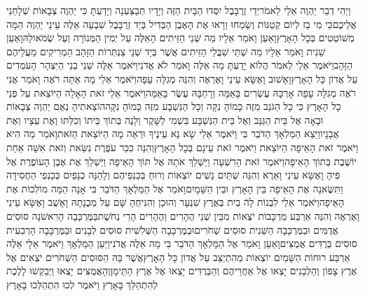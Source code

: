\documentclass[../main/main.tex]{subfiles}
\begin{document}
\begin{multicols*}{\ncols}
וַיְהִי דְבַר יַהְוֶה אֵלַי לֵאמֹר\PreVerseSpace{}יְדֵי זְרֻבָּבֶל יִסְּדוּ הַבַּיִת הַזֶּה וְיָדָיו תְּבַצַּעְנָה וְיָדַעְתָּ כִּי יַהְוֶה צְבָאוֹת שְׁלָחַנִי אֲלֵיכֶם\PreVerseSpace{}כִּי מִי בַז לְיוֹם קְטַנּוֹת וְשָׂמְחוּ וְרָאוּ אֶת הָאֶבֶן הַבְּדִיל בְּיַד זְרֻבָּבֶל שִׁבְעָה אֵלֶּה עֵינֵי יַהְוֶה הֵמָּה מְשׁוֹטְטִים בְּכָל הָאָרֶץ\PreVerseSpace{}וָאַעַן וָאֹמַר אֵלָיו מַה שְּׁנֵי הַזֵּיתִים הָאֵלֶּה עַל יְמִין הַמְּנוֹרָה וְעַל שְׂמֹאולָהּ\PreVerseSpace{}וָאַעַן שֵׁנִית וָאֹמַר אֵלָיו מַה שְׁתֵּי שִׁבֲּלֵי הַזֵּיתִים אֲשֶׁר בְּיַד שְׁנֵי צַנְתְּרוֹת הַזָּהָב הַמְרִיקִים מֵעֲלֵיהֶם הַזָּהָב\PreVerseSpace{}וַיֹּאמֶר אֵלַי לֵאמֹר הֲלוֹא יָדַעְתָּ מָה אֵלֶּה וָאֹמַר לֹא אֲדֹנִי\PreVerseSpace{}וַיֹּאמֶר אֵלֶּה שְׁנֵי בְנֵי הַיִּצְהָר הָעֹמְדִים עַל אֲדוֹן כָּל הָאָרֶץ\PreChapterSpace{}וָאָשׁוּב וָאֶשָּׂא עֵינַי וָאֶרְאֶה וְהִנֵּה מְגִלָּה עָפָה\PreVerseSpace{}וַיֹּאמֶר אֵלַי מָה אַתָּה רֹאֶה וָאֹמַר אֲנִי רֹאֶה מְגִלָּה עָפָה אָרְכָּהּ עֶשְׂרִים בָּאַמָּה וְרָחְבָּהּ עֶשֶׂר בָּאַמָּה\PreVerseSpace{}וַיֹּאמֶר אֵלַי זֹאת הָאָלָה הַיּוֹצֵאת עַל פְּנֵי כָל הָאָרֶץ כִּי כָל הַגֹּנֵב מִזֶּה כָּמוֹהָ נִקָּה וְכָל הַנִּשְׁבָּע מִזֶּה כָּמוֹהָ נִקָּה\PreVerseSpace{}הוֹצֵאתִיהָ נְאֻם יַהְוֶה צְבָאוֹת וּבָאָה אֶל בֵּית הַגַּנָּב וְאֶל בֵּית הַנִּשְׁבָּע בִּשְׁמִי לַשָּׁקֶר וְלָנֶה בְּתוֹךְ בֵּיתוֹ וְכִלַּתּוּ וְאֶת עֵצָיו וְאֶת אֲבָנָיו\PreVerseSpace{}וַיֵּצֵא הַמַּלְאָךְ הַדֹּבֵר בִּי וַיֹּאמֶר אֵלַי שָׂא נָא עֵינֶיךָ וּרְאֵה מָה הַיּוֹצֵאת הַזֹּאת\PreVerseSpace{}וָאֹמַר מַה הִיא וַיֹּאמֶר זֹאת הָאֵיפָה הַיּוֹצֵאת וַיֹּאמֶר זֹאת עֵינָם בְּכָל הָאָרֶץ\PreVerseSpace{}וְהִנֵּה כִּכַּר עֹפֶרֶת נִשֵּׂאת וְזֹאת אִשָּׁה אַחַת יוֹשֶׁבֶת בְּתוֹךְ הָאֵיפָה\PreVerseSpace{}וַיֹּאמֶר זֹאת הָרִשְׁעָה וַיַּשְׁלֵךְ אֹתָהּ אֶל תּוֹךְ הָאֵיפָה וַיַּשְׁלֵךְ אֶת אֶבֶן הָעוֹפֶרֶת אֶל פִּיהָ \ClosedSection{}וָאֶשָּׂא עֵינַי וָאֵרֶא וְהִנֵּה שְׁתַּיִם נָשִׁים יוֹצְאוֹת וְרוּחַ בְּכַנְפֵיהֶם וְלָהֵנָּה כְנָפַיִם כְּכַנְפֵי הַחֲסִידָה וַתִּשֶּׂאנָה אֶת הָאֵיפָה בֵּין הָאָרֶץ וּבֵין הַשָּׁמָיִם\PreVerseSpace{}וָאֹמַר אֶל הַמַּלְאָךְ הַדֹּבֵר בִּי אָנָה הֵמָּה מוֹלִכוֹת אֶת הָאֵיפָה\PreVerseSpace{}וַיֹּאמֶר אֵלַי לִבְנוֹת לָהֿ בַיִת בְּאֶרֶץ שִׁנְעָר וְהוּכַן וְהִנִּיחֻהָ שָּׁם עַל מְכֻנָתָהּ \ClosedSection{}וָאָשֻׁב וָאֶשָּׂא עֵינַי וָאֶרְאֶה וְהִנֵּה אַרְבַּע מַרְכָּבוֹת יֹצְאוֹת מִבֵּין שְׁנֵי הֶהָרִים וְהֶהָרִים הָרֵי נְחֹשֶׁת\PreVerseSpace{}בַּמֶּרְכָּבָה הָרִאשֹׁנָה סוּסִים אֲדֻמִּים וּבַמֶּרְכָּבָה הַשֵּׁנִית סוּסִים שְׁחֹרִים\PreVerseSpace{}וּבַמֶּרְכָּבָה הַשְּׁלִשִׁית סוּסִים לְבָנִים וּבַמֶּרְכָּבָה הָרְבִעִית סוּסִים בְּרֻדִּים אֲמֻצִּים\PreVerseSpace{}וָאַעַן וָאֹמַר אֶל הַמַּלְאָךְ הַדֹּבֵר בִּי מָה אֵלֶּה אֲדֹנִי\PreVerseSpace{}וַיַּעַן הַמַּלְאָךְ וַיֹּאמֶר אֵלָי אֵלֶּה אַרְבַּע רוּחוֹת הַשָּׁמַיִם יוֹצְאוֹת מֵהִתְיַצֵּב עַל אֲדוֹן כָּל הָאָרֶץ\PreVerseSpace{}אֲשֶׁר בָּהּ הַסּוּסִים הַשְּׁחֹרִים יֹצְאִים אֶל אֶרֶץ צָפוֹן וְהַלְּבָנִים יָצְאוּ אֶל אַחֲרֵיהֶם וְהַבְּרֻדִּים יָצְאוּ אֶל אֶרֶץ הַתֵּימָן\PreVerseSpace{}וְהָאֲמֻצִּים יָצְאוּ וַיְבַקְשׁוּ לָלֶכֶת לְהִתְהַלֵּךְ בָּאָרֶץ וַיֹּאמֶר לְכוּ הִתְהַלְּכוּ בָאָרֶץ 
\end{multicols*}
\end{document}
